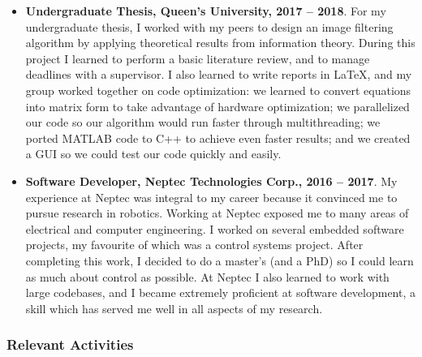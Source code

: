 \documentclass[letterpaper,12pt]{article}
\begin{document}
\begin{itemize}
    \item \textbf{Undergraduate Thesis, Queen's University, 2017 -- 2018}.
        For my undergraduate thesis, I worked with my peers to design an image
        filtering algorithm by applying theoretical results from information theory.
        During this project I learned to perform a basic literature review,
        and to manage deadlines with a supervisor.
        I also learned to write reports in LaTeX,
        and my group worked together on code optimization: we learned to
        convert equations into matrix form to take advantage of hardware
        optimization; we parallelized our code so our algorithm would run faster
        through multithreading; we ported MATLAB code to C++ to achieve even
        faster results; and we created a GUI so we could test our code quickly
        and easily.

    \item \textbf{Software Developer, Neptec Technologies Corp., 2016 -- 2017}.
        My experience at Neptec was integral to my career because it convinced
        me to pursue research in robotics.
        Working at Neptec exposed me to many areas of electrical and computer
        engineering.
        I worked on several embedded software projects, my favourite of which
        was a control systems project.
        After completing this work, I decided to do a master's (and a PhD) so I
        could learn as much about control as possible.
        At Neptec I also learned to work with large codebases,
        and I became extremely proficient at software development, a skill which
        has served me well in all aspects of my research.
        
\end{itemize}

\subsubsection*{Relevant Activities}
\end{document}
